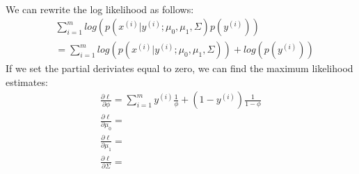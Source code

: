 \begin{answer}\\
    We can rewrite the log likelihood as follows:
    $$
        \begin{aligned}
             & \sum_{i=1}^m log(p(x^{(i)} | y^{(i)}; \mu_{0}, \mu_1, \Sigma) p(y^{(i)}))          \\
             & = \sum_{i=1}^m log(p(x^{(i)} | y^{(i)}; \mu_{0}, \mu_1, \Sigma)) + log(p(y^{(i)}))
        \end{aligned}
    $$
    If we set the partial deriviates equal to zero, we can find the maximum likelihood estimates:
    $$
        \begin{aligned}
            \frac{\partial \ell}{\partial \phi} =\sum_{i=1}^{m} y^{(i)}\frac{1}{\phi} + (1-y^{(i)})\frac{1}{1-\phi} \\ %
            \frac{\partial \ell}{\partial \mu_0} =\\
            \frac{\partial \ell}{\partial \mu_1} =\\
            \frac{\partial \ell}{\partial \Sigma} =\\
        \end{aligned}
    $$
\end{answer}

